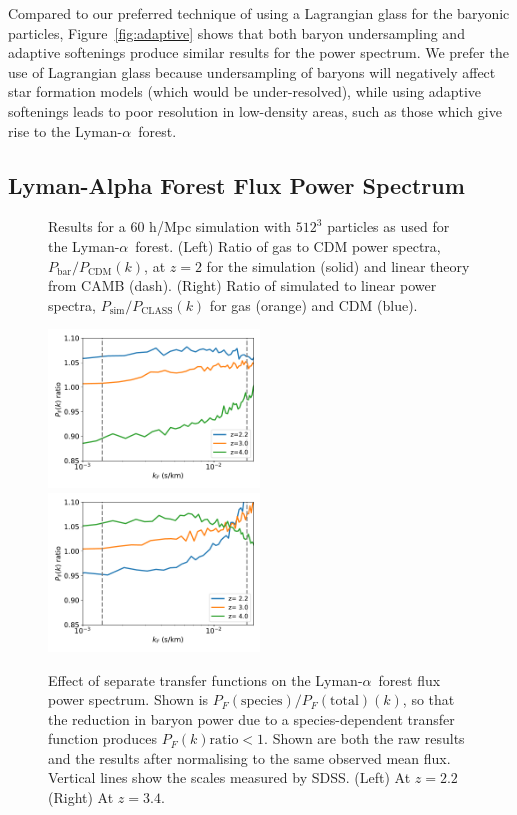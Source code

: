 \documentclass[a4paper,11pt]{article}
\newcommand{\Lya}{Lyman-$\alpha$}
\begin{document}
Compared to our preferred technique of using a Lagrangian glass for the baryonic particles, Figure~\ref{fig:adaptive} shows that both baryon undersampling and adaptive softenings produce similar results for the power spectrum. We prefer the use of Lagrangian glass because undersampling of baryons will negatively affect star formation models (which would be under-resolved), while using adaptive softenings leads to poor resolution in low-density areas, such as those which give rise to the \Lya~forest.

\subsection{Lyman-Alpha Forest Flux Power Spectrum}

\begin{figure}
\caption{Results for a $60$ h/Mpc simulation with $512^3$ particles as used for the \Lya~forest. (Left) Ratio of gas to CDM power spectra, $P_\mathrm{bar}/P_\mathrm{CDM}(k)$, at $z=2$ for the simulation (solid) and linear theory from CAMB (dash). (Right) Ratio of simulated to linear power spectra, $P_\mathrm{sim}/P_\mathrm{CLASS}(k)$ for gas (orange) and CDM (blue).}
\label{fig:lyamatter}
\end{figure}

\begin{figure}
\includegraphics[width=0.5\textwidth]{plots/lya120_relflux_nomf.pdf}
\includegraphics[width=0.5\textwidth]{plots/lya120_relflux_mf_t0.pdf}
\caption{Effect of separate transfer functions on the \Lya~forest flux power spectrum. Shown is $P_F(\mathrm{species})/P_F(\mathrm{total})(k)$, so that the reduction in baryon power due to a species-dependent transfer function produces $P_F(k) \mathrm{ratio} < 1$. Shown are both the raw results and the results after normalising to the same observed mean flux. Vertical lines show the scales measured by SDSS.
(Left) At $z=2.2$ (Right) At $z=3.4$. }
\label{fig:lyaflux}
\end{figure}
\end{document}
